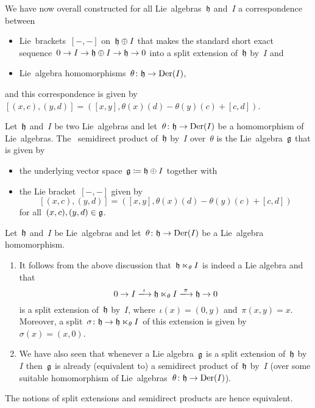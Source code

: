 \begin{example}
  We have now overall constructed for all Lie~algebras~$\mathfrak{h}$ and~$I$ a {\onetoone} correspondence between
  \begin{itemize}
    \item
      Lie~brackets~$[-,-]$ on~$\mathfrak{h} \oplus I$ that makes the standard short exact sequence~$0 \to I \to \mathfrak{h} \oplus I \to \mathfrak{h} \to 0$ into a split extension of~$\mathfrak{h}$ by~$I$ and
    \item
      Lie~algebra homomorphisms~$\theta \colon \mathfrak{h} \to \operatorname{Der}(I)$,
  \end{itemize}
  and this correspondence is given by~$[(x,c), (y,d)] = ([x,y], \theta(x)(d) - \theta(y)(c) + [c,d])$.
\end{example}


\begin{definition}
  Let~$\mathfrak{h}$ and~$I$ be two Lie~algebras and let~$\theta \colon \mathfrak{h} \to \operatorname{Der}(I)$ be a homomorphism of Lie~algebras.
  The ~\gls*{semidirect product} of~$\mathfrak{h}$ by~$I$ over~$\theta$ is the Lie~algebra~$\mathfrak{g}$ that is given by
  \begin{itemize}
    \item
      the underlying vector space~$\mathfrak{g} \coloneqq \mathfrak{h} \oplus I$ together with
    \item
      the Lie bracket~$[-,-]$ given by
      \[
        [(x,c), (y,d)]
        =
        ([x,y], \theta(x)(d) - \theta(y)(c) + [c,d])
      \]
      for all~$(x,c), (y,d) \in \mathfrak{g}$.
  \end{itemize}
\end{definition}


\begin{remark}
  Let~$\mathfrak{h}$ and~$I$ be Lie~algebras and let~$\theta \colon \mathfrak{h} \to \operatorname{Der}(I)$ be a Lie~algebra homomorphism.
  \begin{enumerate}
    \item
      It follows from the above discussion that~$\mathfrak{h} \ltimes_\theta I$ is indeed a Lie algebra and that
      \[
        0
        \to
        I
        \xlongto{\iota}
        \hlie \ltimes_\theta I
        \xlongto{\pi}
        \hlie
        \to
        0
      \]
      is a split extension of~$\mathfrak{h}$ by~$I$, where~$\iota(x) = (0,y)$ and~$\pi(x,y) = x$.
      Moreover, a split~$\sigma \colon \mathfrak{h} \to \mathfrak{h} \ltimes_\theta I$ of this extension is given by~$\sigma(x) = (x,0)$.
    \item
      We have also seen that whenever a Lie algebra~$\mathfrak{g}$ is a split extension of~$\mathfrak{h}$ by~$I$ then~$\mathfrak{g}$ is already (equivalent to) a semidirect product of~$\mathfrak{h}$ by~$I$ (over some suitable homomorphism of Lie~algebras~$\theta \colon \mathfrak{h} \to \operatorname{Der}(I)$).
  \end{enumerate}
  The notions of split extensions and semidirect products are hence equivalent.
\end{remark}


